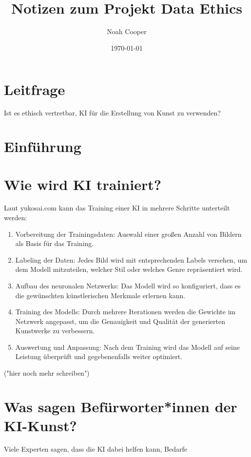 \documentclass{article}
\title{Notizen zum Projekt Data Ethics}
\author{Noah Cooper}
\date{\today}
\begin{document}
\maketitle


\tableofcontents

\section{Leitfrage}
    Ist es ethisch vertretbar, KI für die Erstellung von Kunst zu verwenden?

\section{Einführung}


\section{Wie wird KI trainiert?}
    Laut yukosai.com kann das Training einer KI in mehrere Schritte unterteilt werden:
    \begin{enumerate}
        \item Vorbereitung der Trainingsdaten: Auswahl einer großen Anzahl von Bildern als Basis für das Training.
        \item Labeling der Daten: Jedes Bild wird mit entsprechenden Labels versehen, um dem Modell mitzuteilen, welcher Stil oder welches Genre repräsentiert wird.
        \item Aufbau des neuronalen Netzwerks: Das Modell wird so konfiguriert, dass es die gewünschten künstlerischen Merkmale erlernen kann.
        \item Training des Modells: Durch mehrere Iterationen werden die Gewichte im Netzwerk angepasst, um die Genauigkeit und Qualität der generierten Kunstwerke zu verbessern.
        \item Auswertung und Anpassung: Nach dem Training wird das Modell auf seine Leistung überprüft und gegebenenfalls weiter optimiert.
    \end{enumerate}
    ("hier noch mehr schreiben")

\section{Was sagen Befürworter*innen der KI-Kunst?}
    Viele Experten sagen, dass die KI dabei helfen kann, Bedarfe
\end{document}
